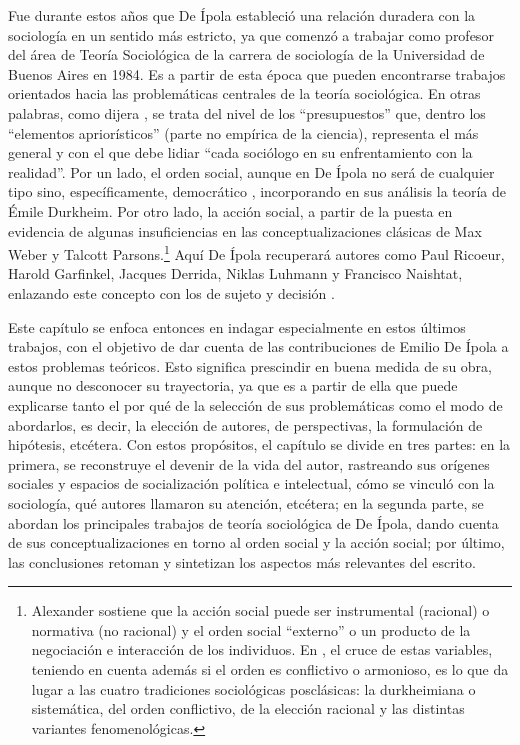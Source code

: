 Fue durante estos años que De Ípola estableció una relación duradera con la sociología en un sentido más estricto, ya que comenzó a trabajar como profesor del área de Teoría Sociológica de la carrera de sociología de la Universidad de Buenos Aires en 1984. Es a partir de esta época que pueden encontrarse trabajos orientados hacia las problemáticas centrales de la teoría sociológica. En otras palabras, como dijera \textcite[18]{1516-ALEXANDER2008}, se trata del nivel de los \enquote{presupuestos} que, dentro los \enquote{elementos apriorísticos} (parte no empírica de la ciencia), representa el más general y con el que debe lidiar \enquote{cada sociólogo en su enfrentamiento con la realidad}. Por un lado, el orden social, aunque en De Ípola no será de cualquier tipo sino, específicamente, democrático \parencite{1540-PORTANTIERO1987,1592-DEIPOLA1997}, incorporando en sus análisis la teoría de Émile Durkheim. Por otro lado, la acción social, a partir de la puesta en evidencia de algunas insuficiencias en las conceptualizaciones clásicas de Max Weber y Talcott Parsons.\footnote{Alexander sostiene que la acción social puede ser instrumental (racional) o normativa (no racional) y el orden social \enquote{externo} o un producto de la negociación e interacción de los individuos. En \textcite{1584-COLLINS2000}, el cruce de estas variables, teniendo en cuenta además si el orden es conflictivo o armonioso, es lo que da lugar a las cuatro tradiciones sociológicas posclásicas: la durkheimiana o sistemática, del orden conflictivo, de la elección racional y las distintas variantes fenomenológicas.} Aquí De Ípola recuperará autores como Paul Ricoeur, Harold Garfinkel, Jacques Derrida, Niklas Luhmann y Francisco Naishtat, enlazando este concepto con los de sujeto y decisión \parencite{1600-DEIPOLA2001,1603-DEIPOLA2004}.

Este capítulo se enfoca entonces en indagar especialmente en estos últimos trabajos, con el objetivo de dar cuenta de las contribuciones de Emilio De Ípola a estos problemas teóricos. Esto significa prescindir en buena medida de su obra, aunque no desconocer su trayectoria, ya que es a partir de ella que puede explicarse tanto el por qué de la selección de sus problemáticas como el modo de abordarlos, es decir, la elección de autores, de perspectivas, la formulación de hipótesis, etcétera. Con estos propósitos, el capítulo se divide en tres partes: en la primera, se reconstruye el devenir de la vida del autor, rastreando sus orígenes sociales y espacios de socialización política e intelectual, cómo se vinculó con la sociología, qué autores llamaron su atención, etcétera; en la segunda parte, se abordan los principales trabajos de teoría sociológica de De Ípola, dando cuenta de sus conceptualizaciones en torno al orden social y la acción social; por último, las conclusiones retoman y sintetizan los aspectos más relevantes del escrito.


